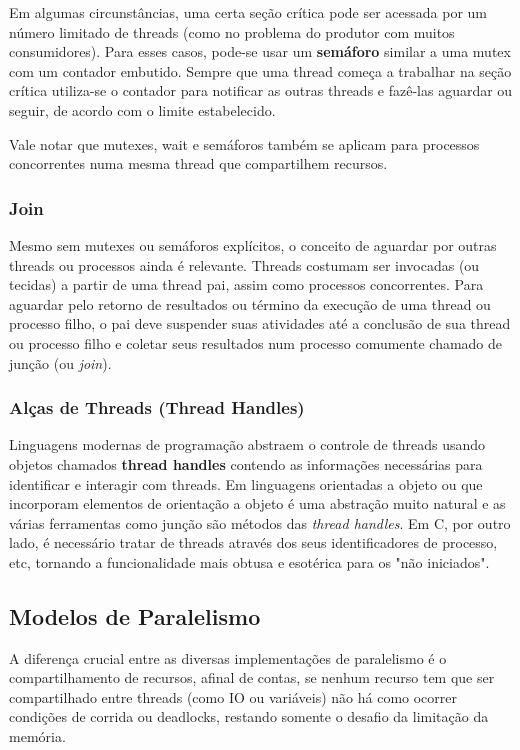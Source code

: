 \documentclass[12pt,a4paper]{article}
\begin{document}
Em algumas circunstâncias, uma certa seção crítica pode ser acessada por um número limitado de threads (como no problema do produtor com muitos consumidores). Para esses casos, pode-se usar um \textbf{semáforo} similar a uma mutex com um contador embutido. Sempre que uma thread começa a trabalhar na seção crítica utiliza-se o contador para notificar as outras threads e fazê-las aguardar ou seguir, de acordo com o limite estabelecido.

Vale notar que mutexes, wait e semáforos também se aplicam para processos concorrentes numa mesma thread que compartilhem recursos.

\subsubsection{Join}
\label{sssec:join}

Mesmo sem mutexes ou semáforos explícitos, o conceito de aguardar por outras threads ou processos ainda é relevante. Threads costumam ser invocadas (ou tecidas) a partir de uma thread pai, assim como processos concorrentes. Para aguardar pelo retorno de resultados ou término da execução de uma thread ou processo filho, o pai deve suspender suas atividades até a conclusão de sua thread ou processo filho e coletar seus resultados num processo comumente chamado de junção (ou \emph{join}).

\subsubsection{Alças de Threads (Thread Handles)}
\label{sssec:thread handles}

Linguagens modernas de programação abstraem o controle de threads usando objetos chamados \textbf{thread handles} contendo as informações necessárias para identificar e interagir com threads. Em linguagens orientadas a objeto ou que incorporam elementos de orientação a objeto é uma abstração muito natural e as várias ferramentas como junção são métodos das \emph{thread handles}. Em C, por outro lado, é necessário tratar de threads através dos seus identificadores de processo, etc, tornando a funcionalidade mais obtusa e esotérica para os "não iniciados".

\subsection{Modelos de Paralelismo}
\label{ssec:modelos paralelismo}

A diferença crucial entre as diversas implementações de paralelismo é o compartilhamento de recursos, afinal de contas, se nenhum recurso tem que ser compartilhado entre threads (como IO ou variáveis) não há como ocorrer condições de corrida ou deadlocks, restando somente o desafio da limitação da memória.
\end{document}
